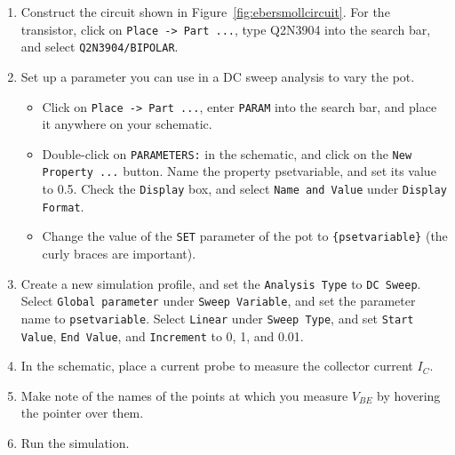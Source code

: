 \documentclass[11pt]{article}
\begin{document}
\begin{enumerate}
\item Construct the circuit shown in
  Figure~\ref{fig:ebersmollcircuit}. For the transistor, click on
  \texttt{Place -> Part ...}, type Q2N3904 into the search bar, and
  select \texttt{Q2N3904/BIPOLAR}.

\item Set up a parameter you can use in a DC sweep analysis to vary
  the pot.
  \begin{itemize}
    \item Click on \texttt{Place -> Part ...}, enter \texttt{PARAM} into
      the search bar, and place it anywhere on your schematic.

    \item Double-click on \texttt{PARAMETERS:} in the schematic, and
      click on the \texttt{New Property ...} button. Name the property
      psetvariable, and set its value to 0.5. Check the
      \texttt{Display} box, and select \texttt{Name and Value} under
      \texttt{Display Format}.
    \item Change the value of the \texttt{SET} parameter of the pot to
      \verb+{psetvariable}+ (the curly braces are important).
  \end{itemize}

\item Create a new simulation profile, and set the \texttt{Analysis
  Type} to \texttt{DC Sweep}. Select \texttt{Global parameter} under
  \texttt{Sweep Variable}, and set the parameter name to
  \texttt{psetvariable}. Select \texttt{Linear} under \texttt{Sweep
    Type}, and set \texttt{Start Value}, \texttt{End Value}, and
  \texttt{Increment} to 0, 1, and 0.01.

\item In the schematic, place a current probe to measure the collector
  current $I_C$.

\item Make note of the names of the points at which you measure
  $V_{BE}$ by hovering the pointer over them.

\item Run the simulation.


\end{enumerate}
\end{document}
